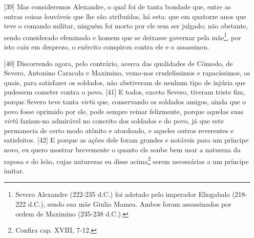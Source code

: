 {[}39{]} Mas consideremos Alexandre, o qual foi de tanta bondade que,
entre as outras coisas louváveis que lhe são atribuídas, há esta: que em
quatorze anos que teve o comando militar, ninguém foi morto por ele sem
ser julgado; não obstante, sendo considerado efeminado e homem que se
deixasse governar pela mãe\footnote{Severo Alexandre (222-235 d.C.) foi
  adotado pelo imperador Eliogabalo (218-222 d.C.), sendo sua mãe Giulia
  Mamea. Ambos foram assassinados por ordem de Maximino (235-238 d.C.).},
por isto caiu em desprezo, o exército conspirou contra ele e o
assassinou.

{[}40{]} Discorrendo agora, pelo contrário, acerca das qualidades de
Cômodo, de Severo, Antonino Caracala e Maximino, vemo-nos crudelíssimos
e rapacíssimos, os quais, para satisfazer os soldados, não abstiveram de
nenhum tipo de injúria que pudessem cometer contra o povo. {[}41{]} E
todos, exceto Severo, tiveram triste fim, porque Severo teve tanta
\emph{virtù} que, conservando os soldados amigos, ainda que o povo fosse
oprimido por ele, pode sempre reinar felizmente, porque aquelas suas
\emph{virtù} faziam-no admirável no conceito dos soldados e do povo, já
que este permanecia de certo modo atônito e atordoado, e aqueles outros
reverentes e satisfeitos. {[}42{]} E porque as ações dele foram grandes
e notáveis para um príncipe novo, eu quero mostrar brevemente o quanto
ele soube bem usar a natureza da raposa e do leão, cujas naturezas eu
disse acima\footnote{Confira cap. XVIII, 7-12.} serem necessárias a um
príncipe imitar.

